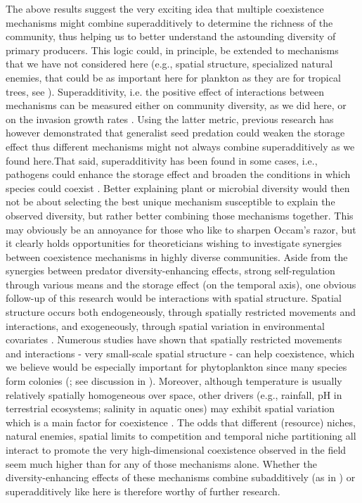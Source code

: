 \documentclass[a4paper,12pt]{article}
\begin{document}
The above results suggest the very exciting idea that multiple coexistence
mechanisms might combine superadditively to determine the richness
of the community, thus helping us to better understand the astounding
diversity of primary producers. This logic could, in principle, be
extended to mechanisms that we have not considered here (e.g., spatial
structure, specialized natural enemies, that could be as important
here for plankton as they are for tropical trees, see \citealp{bagchi_pathogens_2014,comita_testing_2014,barraquand2018coastal}).
Superadditivity, i.e. the positive effect of interactions between
mechanisms can be measured either on community diversity, as we did
here, or on the invasion growth rates \citep{ellner_expanded_2019}.
Using the latter metric, previous research has however demonstrated
that generalist seed predation could weaken the storage effect \citep{kuang_coexistence_2009,kuang_interacting_2010}
thus different mechanisms might not always combine superadditively
as we found here.That said, superadditivity has been found in some
cases, i.e., pathogens could enhance the storage effect and broaden
the conditions in which species could coexist \citep{mordecai_pathogen_2015}.
Better explaining plant or microbial diversity would then not be about
selecting the best unique mechanism susceptible to explain the observed
diversity, but rather better combining those mechanisms together.
This may obviously be an annoyance for those who like to sharpen Occam's
razor, but it clearly holds opportunities for theoreticians wishing
to investigate synergies between coexistence mechanisms in highly
diverse communities. Aside from the synergies between predator diversity-enhancing
effects, strong self-regulation through various means and the storage
effect (on the temporal axis), one obvious follow-up of this research
would be interactions with spatial structure. Spatial structure occurs
both endogeneously, through spatially restricted movements and interactions,
and exogeneously, through spatial variation in environmental covariates
\citep{bolker_combining_2003}. Numerous studies \citep[e.g.,][]{bolker_spatial_1999,murrell_2002}
have shown that spatially restricted movements and interactions -
very small-scale spatial structure - can help coexistence, which we
believe would be especially important for phytoplankton since many
species form colonies (\citealp{reynolds2006ecology}; see discussion
in \citealp{barraquand2018coastal}). Moreover, although temperature
is usually relatively spatially homogeneous over space, other drivers
(e.g., rainfall, pH in terrestrial ecosystems; salinity in aquatic
ones) may exhibit spatial variation which is a main factor for coexistence
\citep{snyder_when_2008}. The odds that different (resource) niches,
natural enemies, spatial limits to competition and temporal niche
partitioning all interact to promote the very high-dimensional coexistence
observed in the field seem much higher than for any of those mechanisms
alone. Whether the diversity-enhancing effects of these mechanisms
combine subadditively (as in \citealp{kuang_interacting_2010}) or
superadditively like here is therefore worthy of further research.
\end{document}
